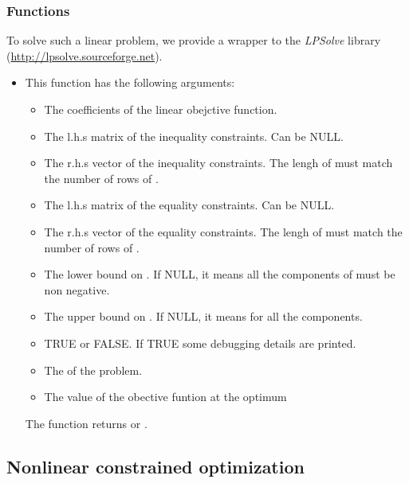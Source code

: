 \subsubsection{Functions}
To solve such a linear problem, we provide a wrapper to the \emph{LPSolve} library
(\url{http://lpsolve.sourceforge.net}).
\begin{itemize}
  \item {}
    \sshortdescribe This function has the following arguments:
    \begin{itemize}
      \item {} The coefficients of the linear obejctive function.
      \item {} The l.h.s matrix of the inequality constraints. Can be NULL.
      \item {} The r.h.s vector of the inequality constraints. The lengh of
         must match the number of rows of .
      \item {} The l.h.s matrix of the equality constraints. Can be NULL.
      \item {} The r.h.s vector of the equality constraints. The lengh of
         must match the number of rows of .
      \item {} The lower bound on . If NULL, it means all the components
        of  must be non negative.
      \item {} The upper bound on . If NULL, it means  for
        all the components.
      \item {} TRUE or FALSE. If TRUE some debugging details are printed.
      \item {} The  of the problem.
      \item {} The value of the obective funtion at the optimum 
    \end{itemize}
    The function returns  or .
\end{itemize}


\subsection{Nonlinear constrained optimization}
